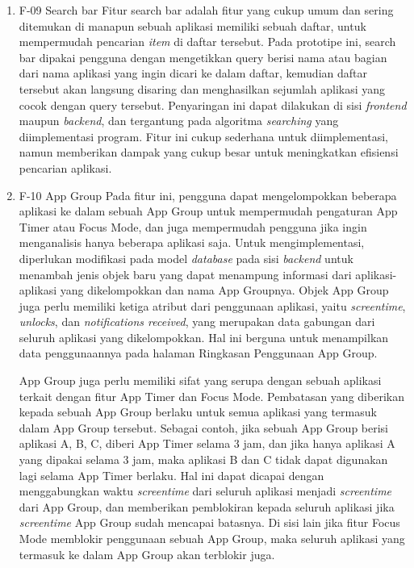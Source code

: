 \begin{enumerate}
  \item F-09 Search bar
  \subitem Fitur search bar adalah fitur yang cukup umum dan sering ditemukan di manapun sebuah aplikasi memiliki sebuah daftar, untuk mempermudah pencarian \textit{item} di daftar tersebut. Pada prototipe ini, search bar dipakai pengguna dengan mengetikkan query berisi nama atau bagian dari nama aplikasi yang ingin dicari ke dalam daftar, kemudian daftar tersebut akan langsung disaring dan menghasilkan sejumlah aplikasi yang cocok dengan query tersebut. Penyaringan ini dapat dilakukan di sisi \textit{frontend} maupun \textit{backend}, dan tergantung pada algoritma \textit{searching} yang diimplementasi program. Fitur ini cukup sederhana untuk diimplementasi, namun memberikan dampak yang cukup besar untuk meningkatkan efisiensi pencarian aplikasi. 
    
  \item F-10 App Group
  \subitem Pada fitur ini, pengguna dapat mengelompokkan beberapa aplikasi ke dalam sebuah App Group untuk mempermudah pengaturan App Timer atau Focus Mode, dan juga mempermudah pengguna jika ingin menganalisis hanya beberapa aplikasi saja. Untuk mengimplementasi, diperlukan modifikasi pada model \textit{database} pada sisi \textit{backend} untuk menambah jenis objek baru yang dapat menampung informasi dari aplikasi-aplikasi yang dikelompokkan dan nama App Groupnya. Objek App Group juga perlu memiliki ketiga atribut dari penggunaan aplikasi, yaitu \textit{screentime}, \textit{unlocks}, dan \textit{notifications received}, yang merupakan data gabungan dari seluruh aplikasi yang dikelompokkan. Hal ini berguna untuk menampilkan data penggunaannya pada halaman Ringkasan Penggunaan App Group.

  App Group juga perlu memiliki sifat yang serupa dengan sebuah aplikasi terkait dengan fitur App Timer dan Focus Mode. Pembatasan yang diberikan kepada sebuah App Group berlaku untuk semua aplikasi yang termasuk dalam App Group tersebut. Sebagai contoh, jika sebuah App Group berisi aplikasi A, B, C, diberi App Timer selama 3 jam, dan jika hanya aplikasi A yang dipakai selama 3 jam, maka aplikasi B dan C tidak dapat digunakan lagi selama App Timer berlaku. Hal ini dapat dicapai dengan menggabungkan waktu \textit{screentime} dari seluruh aplikasi menjadi \textit{screentime} dari App Group, dan memberikan pemblokiran kepada seluruh aplikasi jika \textit{screentime} App Group sudah mencapai batasnya. Di sisi lain jika fitur Focus Mode memblokir penggunaan sebuah App Group, maka seluruh aplikasi yang termasuk ke dalam App Group akan terblokir juga.   
    

\end{enumerate}
